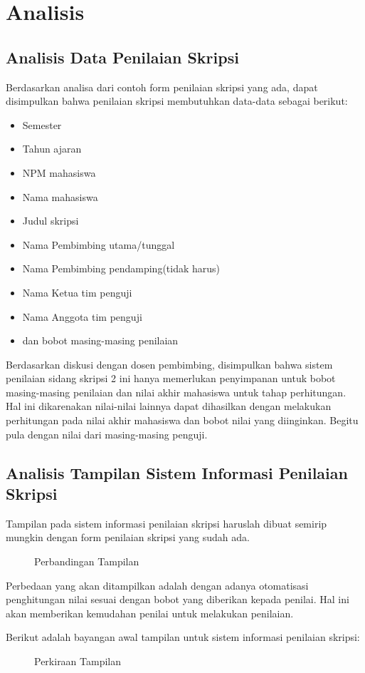 \chapter{Analisis}
\label{chap: analisis}

\section{Analisis Data Penilaian Skripsi}
\label{sec: analisisData}

	Berdasarkan analisa dari contoh form penilaian skripsi yang ada, dapat disimpulkan bahwa penilaian skripsi membutuhkan data-data sebagai berikut:
		
		\begin{itemize}
			\item Semester
			\item Tahun ajaran
			\item NPM mahasiswa 
			\item Nama mahasiswa
			\item Judul skripsi
			\item Nama Pembimbing utama/tunggal
			\item Nama Pembimbing pendamping(tidak harus)
			\item Nama Ketua tim penguji
			\item Nama Anggota tim penguji
			\item dan bobot masing-masing penilaian
		\end{itemize}
	
	Berdasarkan diskusi dengan dosen pembimbing, disimpulkan bahwa sistem penilaian sidang skripsi 2 ini hanya memerlukan penyimpanan untuk bobot masing-masing penilaian dan nilai akhir mahasiswa untuk tahap perhitungan. Hal ini dikarenakan nilai-nilai lainnya dapat dihasilkan dengan melakukan perhitungan pada  nilai akhir mahasiswa dan bobot nilai yang diinginkan. Begitu pula dengan nilai dari masing-masing penguji.
	
\section{Analisis Tampilan Sistem Informasi Penilaian Skripsi}
\label{sec: analisisTampilan}
	
	Tampilan pada sistem informasi penilaian skripsi haruslah dibuat semirip mungkin dengan form penilaian skripsi yang sudah ada.
		
	\begin{figure}[]
		\centering
		\caption{Perbandingan Tampilan \cite{presentasi}}
		\label{fig:tampilan}
	\end{figure}
	
	Perbedaan yang akan ditampilkan adalah dengan adanya otomatisasi penghitungan nilai sesuai dengan bobot yang diberikan kepada penilai. Hal ini akan memberikan kemudahan penilai untuk melakukan penilaian.
	
	Berikut adalah bayangan awal tampilan untuk sistem informasi penilaian skripsi:
	\begin{figure}[]
		\centering
		\caption{Perkiraan Tampilan \cite{presentasi}}
		\label{fig:tampilan1}
	\end{figure}
	